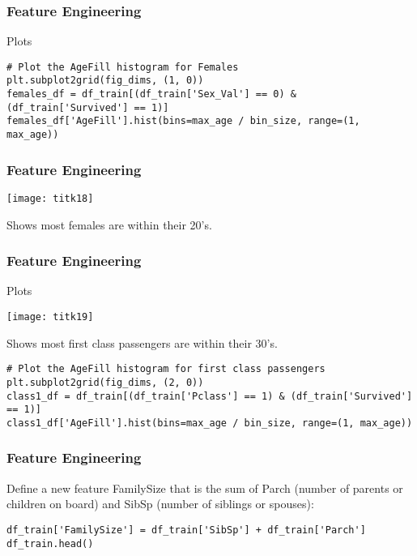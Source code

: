 \begin{frame}[fragile]\frametitle{Feature Engineering}
Plots
\begin{lstlisting}
# Plot the AgeFill histogram for Females
plt.subplot2grid(fig_dims, (1, 0))
females_df = df_train[(df_train['Sex_Val'] == 0) & (df_train['Survived'] == 1)]
females_df['AgeFill'].hist(bins=max_age / bin_size, range=(1, max_age))
\end{lstlisting}

\end{frame}

\begin{frame}[fragile]\frametitle{Feature Engineering}
\begin{center}
\texttt{[image: titk18]}
\end{center}

Shows most females are within their 20's.
\end{frame}


\begin{frame}[fragile]\frametitle{Feature Engineering}
Plots

\begin{center}
\texttt{[image: titk19]}
\end{center}

Shows most first class passengers are within their 30's.

\begin{lstlisting}
# Plot the AgeFill histogram for first class passengers
plt.subplot2grid(fig_dims, (2, 0))
class1_df = df_train[(df_train['Pclass'] == 1) & (df_train['Survived'] == 1)]
class1_df['AgeFill'].hist(bins=max_age / bin_size, range=(1, max_age))
\end{lstlisting}

\end{frame}



\begin{frame}[fragile]\frametitle{Feature Engineering}
Define a new feature FamilySize that is the sum of Parch (number of parents or children on board) and SibSp (number of siblings or spouses):
\begin{lstlisting}
df_train['FamilySize'] = df_train['SibSp'] + df_train['Parch']
df_train.head()
\end{lstlisting}

\end{frame}


